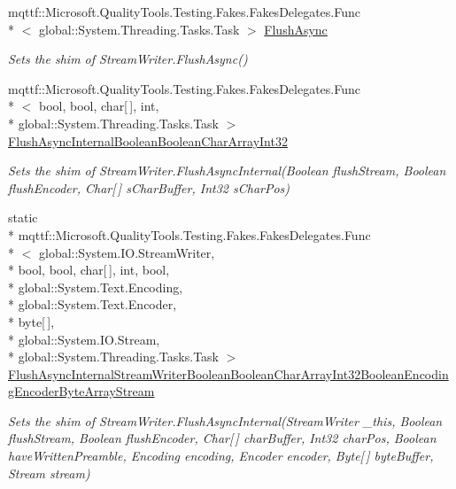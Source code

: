\begin{DoxyCompactItemize}
mqttf\-::\-Microsoft.\-Quality\-Tools.\-Testing.\-Fakes.\-Fakes\-Delegates.\-Func\\*
$<$ global\-::\-System.\-Threading.\-Tasks.\-Task $>$ \hyperlink{class_system_1_1_i_o_1_1_fakes_1_1_shim_stream_writer_a47d5203e93e477a9a2b21808c17503b2}{Flush\-Async}
\begin{DoxyCompactList}\small\item\em Sets the shim of Stream\-Writer.\-Flush\-Async()\end{DoxyCompactList}\item 
mqttf\-::\-Microsoft.\-Quality\-Tools.\-Testing.\-Fakes.\-Fakes\-Delegates.\-Func\\*
$<$ bool, bool, char\mbox{[}$\,$\mbox{]}, int, \\*
global\-::\-System.\-Threading.\-Tasks.\-Task $>$ \hyperlink{class_system_1_1_i_o_1_1_fakes_1_1_shim_stream_writer_a986e05b09f6f78e307a0e902ec6178f5}{Flush\-Async\-Internal\-Boolean\-Boolean\-Char\-Array\-Int32}
\begin{DoxyCompactList}\small\item\em Sets the shim of Stream\-Writer.\-Flush\-Async\-Internal(\-Boolean flush\-Stream, Boolean flush\-Encoder, Char\mbox{[}$\,$\mbox{]} s\-Char\-Buffer, Int32 s\-Char\-Pos)\end{DoxyCompactList}\item 
static \\*
mqttf\-::\-Microsoft.\-Quality\-Tools.\-Testing.\-Fakes.\-Fakes\-Delegates.\-Func\\*
$<$ global\-::\-System.\-I\-O.\-Stream\-Writer, \\*
bool, bool, char\mbox{[}$\,$\mbox{]}, int, bool, \\*
global\-::\-System.\-Text.\-Encoding, \\*
global\-::\-System.\-Text.\-Encoder, \\*
byte\mbox{[}$\,$\mbox{]}, \\*
global\-::\-System.\-I\-O.\-Stream, \\*
global\-::\-System.\-Threading.\-Tasks.\-Task $>$ \hyperlink{class_system_1_1_i_o_1_1_fakes_1_1_shim_stream_writer_a23749d74664c7e9e0e08f667d33ad6b5}{Flush\-Async\-Internal\-Stream\-Writer\-Boolean\-Boolean\-Char\-Array\-Int32\-Boolean\-Encoding\-Encoder\-Byte\-Array\-Stream}
\begin{DoxyCompactList}\small\item\em Sets the shim of Stream\-Writer.\-Flush\-Async\-Internal(\-Stream\-Writer \-\_\-this, Boolean flush\-Stream, Boolean flush\-Encoder, Char\mbox{[}$\,$\mbox{]} char\-Buffer, Int32 char\-Pos, Boolean have\-Written\-Preamble, Encoding encoding, Encoder encoder, Byte\mbox{[}$\,$\mbox{]} byte\-Buffer, Stream stream)\end{DoxyCompactList}\item 

\end{DoxyCompactItemize}
